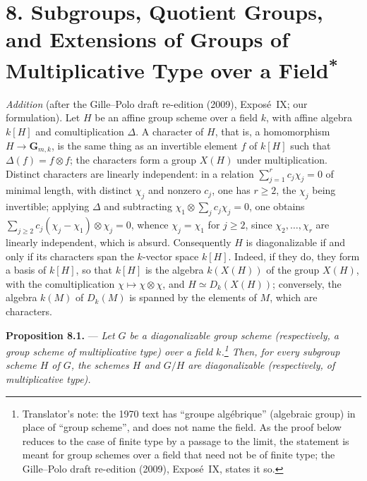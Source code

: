 
\section*{8. Subgroups, Quotient Groups, and Extensions of Groups of
Multiplicative Type over a Field\textsuperscript{*}}
\begingroup
\renewcommand{\thefootnote}{*}
\endgroup

\par\medskip\noindent
\emph{Addition} (after the Gille--Polo draft re-edition (2009),
Expos\'e~IX; our formulation). Let \(H\) be an affine group scheme over a
field \(k\), with affine algebra \(k[H]\) and comultiplication \(\Delta\).
A character of \(H\), that is, a homomorphism \(H\to\mathbf G_{m,k}\), is
the same thing as an invertible element \(f\) of \(k[H]\) such that
\(\Delta(f)=f\otimes f\); the characters form a group \(X(H)\) under
multiplication. Distinct characters are linearly independent: in a
relation \(\sum_{j=1}^rc_j\chi_j=0\) of minimal length, with distinct
\(\chi_j\) and nonzero \(c_j\), one has \(r\geq2\), the \(\chi_j\) being
invertible; applying \(\Delta\) and subtracting
\(\chi_1\otimes\sum_jc_j\chi_j=0\), one obtains
\(\sum_{j\geq2}c_j(\chi_j-\chi_1)\otimes\chi_j=0\), whence
\(\chi_j=\chi_1\) for \(j\geq2\), since \(\chi_2,\ldots,\chi_r\) are
linearly independent, which is absurd. Consequently \(H\) is
diagonalizable if and only if its characters span the \(k\)-vector space
\(k[H]\). Indeed, if they do, they form a basis of \(k[H]\), so that
\(k[H]\) is the algebra \(k(X(H))\) of the group \(X(H)\), with the
comultiplication \(\chi\mapsto\chi\otimes\chi\), and
\(H\simeq D_k(X(H))\); conversely, the algebra \(k(M)\) of \(D_k(M)\) is
spanned by the elements of \(M\), which are characters.
\par

\medskip
\noindent{}\textbf{Proposition 8.1.} ---
\textit{Let \(G\) be a diagonalizable group scheme (respectively, a group
scheme of multiplicative type) over a field \(k\).\footnote{Translator's
note: the 1970 text has ``groupe alg\'ebrique'' (algebraic group) in place
of ``group scheme'', and does not name the field. As the proof below reduces
to the case of finite type by a passage to the limit, the statement is meant
for group schemes over a field that need not be of finite type; the
Gille--Polo draft re-edition (2009), Expos\'e~IX, states it so.} Then, for
every subgroup scheme \(H\) of \(G\), the schemes \(H\) and \(G/H\) are
diagonalizable (respectively, of multiplicative type).}

